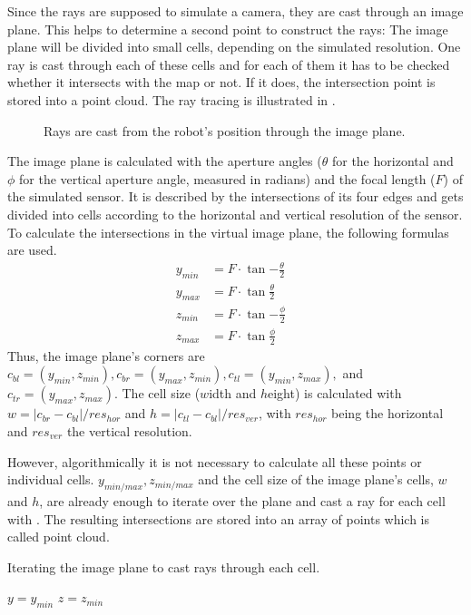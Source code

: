 \documentclass[Thesis.tex]{subfiles}
\begin{document}
Since the rays are supposed to simulate a camera, they are cast through an image plane. This helps to determine a second point to construct the rays: The image plane will be divided into small cells, depending on the simulated resolution. One ray is cast through each of these cells and for each of them it has to be checked whether it intersects with the map or not. If it does, the intersection point is stored into a point cloud. The ray tracing is illustrated in .
%
\begin{figure}[!htp]
  \caption{Rays are cast from the robot's position through the image plane.}
  \label{fig:raytrace_scheme}
\end{figure}
%
The image plane is calculated with the aperture angles ($\theta$ for the horizontal and $\phi$ for the vertical aperture angle, measured in radians) and the focal length ($F$) of the simulated sensor. It is described by the intersections of its four edges and gets divided into cells according to the horizontal and vertical resolution of the sensor. To calculate the intersections in the virtual image plane, the following formulas are used.
%
\begin{align}
y_{min} &= F \cdot \tan{-\frac{\theta}{2}} &\label{form:image_plane} \\
y_{max} &= F \cdot \tan{ \frac{\theta}{2}} &\\
z_{min} &= F \cdot \tan{-\frac{\phi}{2}} &\\
z_{max} &= F \cdot \tan{ \frac{\phi}{2}} &
\end{align}
%
Thus, the image plane's corners are $c_{bl}=(y_{min}, z_{min}), c_{br}=(y_{max}, z_{min}), c_{tl}=(y_{min}, z_{max}),$ and $c_{tr}=(y_{max}, z_{max})$. The cell size ($w$idth and $h$eight) is calculated with $w=|c_{br}-c_{bl}|/res_{hor}$ and $h=|c_{tl}-c_{bl}|/res_{ver}$, with $res_{hor}$ being the horizontal and $res_{ver}$ the vertical resolution.

However, algorithmically it is not necessary to calculate all these points or individual cells. $y_{min/max}, z_{min/max}$ and the cell size of the image plane's cells, $w$ and $h$, are already enough to iterate over the plane and cast a ray for each cell with . The resulting intersections are stored into an array of points which is called point cloud.
%
\begin{algorithm}[!htp]
\caption{Iterating the image plane to cast rays through each cell.}
\label{alg:iterate_imageplane}
$y = y_{min}$\;
$z = z_{min}$\;
\end{algorithm}
\end{document}

